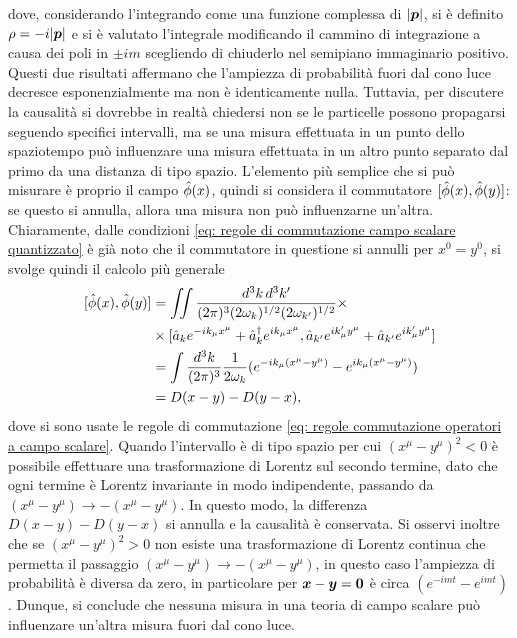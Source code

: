 dove, considerando l'integrando come una funzione complessa di $|\bm{p}|$, si è definito $\rho = -i|\bm{p}|$ e si è valutato l'integrale modificando il cammino di integrazione a causa dei poli in $\pm im$ scegliendo di chiuderlo nel semipiano immaginario positivo. Questi due risultati affermano che l'ampiezza di probabilità fuori dal cono luce decresce esponenzialmente ma non è identicamente nulla. Tuttavia, per discutere la causalità si dovrebbe in realtà chiedersi non se le particelle possono propagarsi seguendo specifici intervalli, ma se una misura effettuata in un punto dello spaziotempo può influenzare una misura effettuata in un altro punto separato dal primo da una distanza di tipo spazio. L'elemento più semplice che si può misurare è proprio il campo $\hat{\phi}(x)$, quindi si considera il commutatore $[\hat{\phi}(x),\hat{\phi}(y)]$: se questo si annulla, allora una misura non può influenzarne un'altra. Chiaramente, dalle condizioni \eqref{eq: regole di commutazione campo scalare quantizzato} è già noto che il commutatore in questione si annulli per $x^0  = y^0$, si svolge quindi il calcolo più generale
\begin{equation}
    \begin{split}
        [\hat{\phi}(x),\hat{\phi}(y)] &= \iint\frac{d^3k\,d^3k'}{(2\pi)^{3}(2\omega_k)^{1/2}(2\omega_{k'})^{1/2}}\times \\
        &\times[\hat{a}_k e^{-ik_\mu x^\mu} + \hat{a}^\dagger_k e^{ik_\mu x^\mu},\hat{a}_{k'} e^{ik'_\mu y^\mu} + \hat{a}_{k'} e^{ik'_\mu y^\mu}] \\
        &= \int\frac{d^3k}{(2\pi)^3}\frac{1}{2\omega_k}(e^{-ik_\mu(x^\mu - y^\mu)} - e^{ik_\mu(x^\mu - y^\mu)}) \\
        &= D(x - y) - D(y - x),
    \end{split}
\end{equation}
dove si sono usate le regole di commutazione \eqref{eq: regole commutazione operatori a campo scalare}. Quando l'intervallo è di tipo spazio per cui $(x^\mu - y^\mu)^2 < 0$ è possibile effettuare una trasformazione di Lorentz sul secondo termine, dato che ogni termine è Lorentz invariante in modo indipendente, passando da $(x^\mu - y^\mu)\to-(x^\mu - y^\mu)$. In questo modo, la differenza $D(x - y) - D(y - x)$ si annulla e la causalità è conservata. Si osservi inoltre che se $(x^\mu - y^\mu)^2 > 0$ non esiste una trasformazione di Lorentz continua che permetta il passaggio $(x^\mu - y^\mu)\to-(x^\mu - y^\mu)$, in questo caso l'ampiezza di probabilità è diversa da zero, in particolare per $\bm{x} - \bm{y} = \bm{0}$ è circa $(e^{-imt} - e^{imt})$. Dunque, si conclude che nessuna misura in una teoria di campo scalare può influenzare un'altra misura fuori dal cono luce. 

